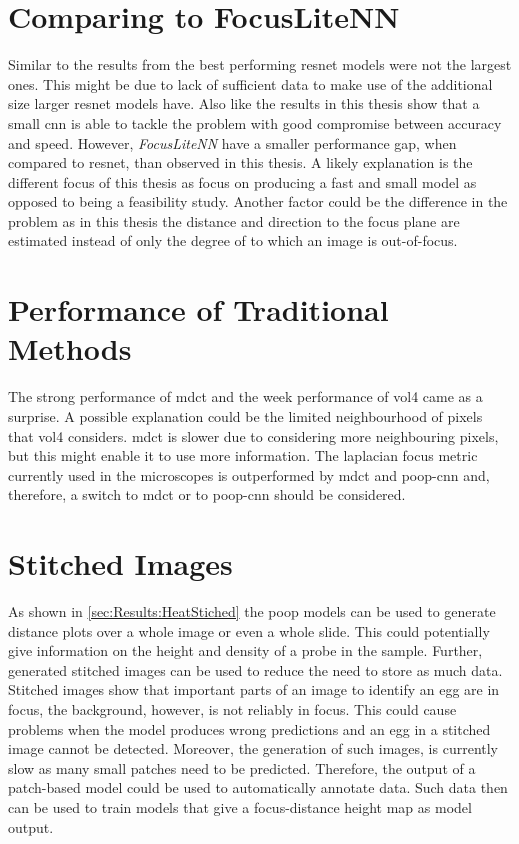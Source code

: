 \section{Comparing to FocusLiteNN}
\label{ch:Discussion:FocusLiteNN}

Similar to the results from \textcite{wang2020focuslitenn} the best performing \ac{resnet} models were not the largest ones. This might be due to lack of sufficient data to make use of the additional size larger \ac{resnet} models have. Also like \citeauthor{wang2020focuslitenn} the results in this thesis show that a small \ac{cnn} is able to tackle the problem with good compromise between accuracy and speed. However, \citeauthor{wang2020focuslitenn} \textit{FocusLiteNN} have a smaller performance gap, when compared to \ac{resnet}, than observed in this thesis. A likely explanation is the different focus of this thesis as \citeauthor{wang2020focuslitenn} focus on producing a fast and small model as opposed to being a feasibility study. Another factor could be the difference in the problem as in this thesis the distance and direction to the focus plane are estimated instead of only the degree of to which an image is out-of-focus.

\section{Performance of Traditional Methods}
\label{ch:Discussion:PerformanceTraditional}

The strong performance of \ac{mdct} and the week performance of \ac{vol4} came as a surprise. A possible explanation could be the limited neighbourhood of pixels that \ac{vol4} considers. \Ac{mdct} is slower due to considering more neighbouring pixels, but this might enable it to use more information. The \Ac{laplacian} focus metric currently used in the microscopes is outperformed by \ac{mdct} and \ac{poop}-\ac{cnn} and, therefore, a switch to \ac{mdct} or to \ac{poop}-\ac{cnn} should be considered.

\section{Stitched Images}
\label{ch:Discussion:StitchedImages}

As shown in \autoref{sec:Results:HeatStiched} the \ac{poop} models can be used to generate distance plots over a whole image or even a whole slide. This could potentially give information on the height and density of a probe in the sample. Further, generated stitched images can be used to reduce the need to store as much data. Stitched images show that important parts of an image to identify an egg are in focus, the background, however, is not reliably in focus. This could cause problems when the model produces wrong predictions and an egg in a stitched image cannot be detected. Moreover, the generation of such images, is currently slow as many small patches need to be predicted. Therefore, the output of a patch-based model could be used to automatically annotate data. Such data then can be used to train models that give a focus-distance height map as model output.

